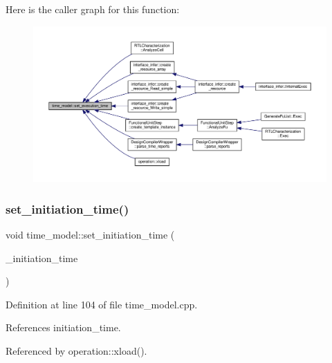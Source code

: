 Here is the caller graph for this function\+:
\nopagebreak
\begin{figure}[H]
\begin{center}
\leavevmode
\includegraphics[width=350pt]{d3/d73/classtime__model_a7bdad7b4a8221d4e5e00286e38084de1_icgraph}
\end{center}
\end{figure}
\mbox{\label{classtime__model_aae177f12db540a3e8d5b487f99ded5e8}} 
\subsubsection{\texorpdfstring{set\+\_\+initiation\+\_\+time()}{set\_initiation\_time()}}
{\footnotesize\ttfamily void time\+\_\+model\+::set\+\_\+initiation\+\_\+time (\begin{DoxyParamCaption}\item[{const Control\+Step}]{\+\_\+initiation\+\_\+time }\end{DoxyParamCaption})}



Definition at line 104 of file time\+\_\+model.\+cpp.



References initiation\+\_\+time.



Referenced by operation\+::xload().

